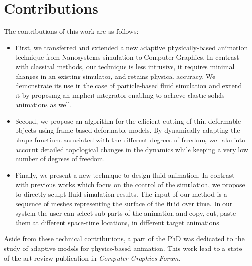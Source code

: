 \section{Contributions}
The contributions of this work are as follows:
\begin{itemize}
    \item First, we transferred and extended a new adaptive physically-based animation technique from Nanosystems simulation to Computer Graphics. In contrast with classical methods, our technique is less intrusive, it requires minimal changes in an existing simulator, and retains physical accuracy. We demonstrate its use in the case of particle-based fluid simulation and extend it by proposing an implicit integrator enabling to achieve elastic solids animations as well.
    \item Second, we propose an algorithm for the efficient cutting of thin deformable objects using frame-based deformable models. By dynamically adapting the shape functions associated with the different degrees of freedom, we take into account detailed topological changes in the dynamics while keeping a very low number of degrees of freedom.
    \item Finally, we present a new technique to design fluid animation. In contrast with previous works which focus on the control of the simulation, we propose to directly sculpt fluid simulation results. The input of our method is a sequence of meshes representing the surface of the fluid over time. In our system the user can select sub-parts of the animation and copy, cut, paste them at different space-time locations, in different target animations.
\end{itemize}
Aside from these technical contributions, a part of the PhD was dedicated to the study of adaptive models for physics-based animation. This work lead to a state of the art review publication in \emph{Computer Graphics Forum.}

